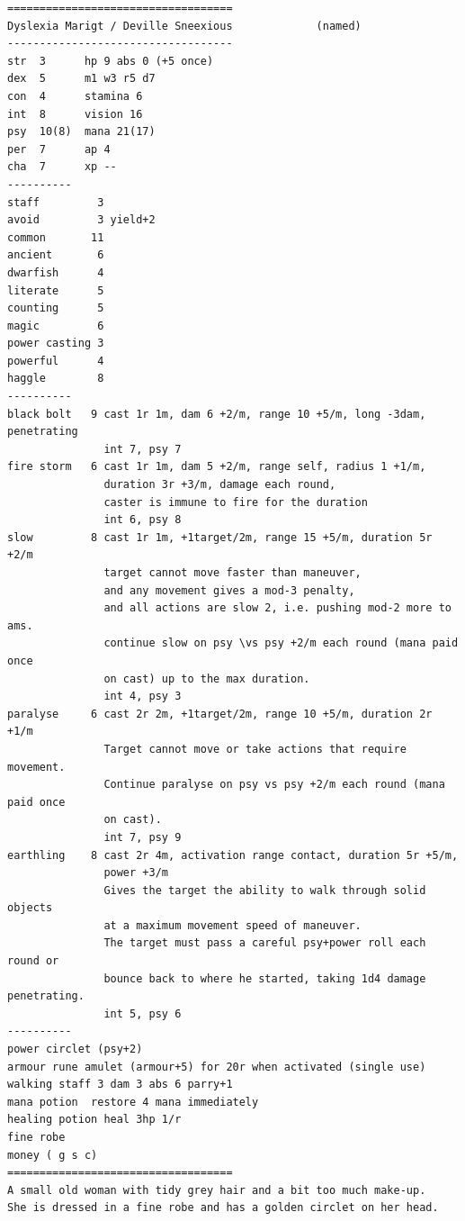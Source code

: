 \goodbreak \begin{samepage} \vsmall \begin{verbatim}
===================================
Dyslexia Marigt / Deville Sneexious             (named)
-----------------------------------
str  3      hp 9 abs 0 (+5 once)
dex  5      m1 w3 r5 d7
con  4      stamina 6
int  8      vision 16
psy  10(8)  mana 21(17)
per  7      ap 4
cha  7      xp --
----------
staff         3
avoid         3 yield+2
common       11
ancient       6
dwarfish      4
literate      5
counting      5
magic         6
power casting 3
powerful      4
haggle        8
----------
black bolt   9 cast 1r 1m, dam 6 +2/m, range 10 +5/m, long -3dam, penetrating
               int 7, psy 7
fire storm   6 cast 1r 1m, dam 5 +2/m, range self, radius 1 +1/m,
               duration 3r +3/m, damage each round,
               caster is immune to fire for the duration
               int 6, psy 8
slow         8 cast 1r 1m, +1target/2m, range 15 +5/m, duration 5r +2/m
               target cannot move faster than maneuver,
               and any movement gives a mod-3 penalty,
               and all actions are slow 2, i.e. pushing mod-2 more to ams.
               continue slow on psy \vs psy +2/m each round (mana paid once
               on cast) up to the max duration.
               int 4, psy 3
paralyse     6 cast 2r 2m, +1target/2m, range 10 +5/m, duration 2r +1/m
               Target cannot move or take actions that require movement.
               Continue paralyse on psy vs psy +2/m each round (mana paid once
               on cast).
               int 7, psy 9
earthling    8 cast 2r 4m, activation range contact, duration 5r +5/m,
               power +3/m
               Gives the target the ability to walk through solid objects
               at a maximum movement speed of maneuver.
               The target must pass a careful psy+power roll each round or
               bounce back to where he started, taking 1d4 damage penetrating.
               int 5, psy 6
----------
power circlet (psy+2)
armour rune amulet (armour+5) for 20r when activated (single use)
walking staff 3 dam 3 abs 6 parry+1
mana potion  restore 4 mana immediately
healing potion heal 3hp 1/r
fine robe
money ( g s c)
===================================
A small old woman with tidy grey hair and a bit too much make-up.
She is dressed in a fine robe and has a golden circlet on her head.
\end{verbatim} \normalsize \end{samepage}

